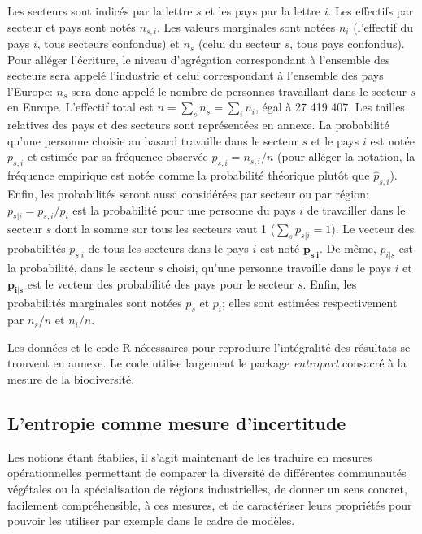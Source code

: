 \documentclass[fleqn,10pt]{ArtEcoFoG} %
\begin{document}
Les secteurs sont indicés par la lettre \(s\) et les pays par la lettre
\(i\). Les effectifs par secteur et pays sont notés \(n_{s,i}\). Les
valeurs marginales sont notées \(n_i\) (l'effectif du pays \(i\), tous
secteurs confondus) et \(n_s\) (celui du secteur \(s\), tous pays
confondus). Pour alléger l'écriture, le niveau d'agrégation
correspondant à l'ensemble des secteurs sera appelé \og l'industrie\fg{}
et celui correspondant à l'ensemble des pays \og l'Europe\fg{}: \(n_s\)
sera donc appelé le nombre de personnes travaillant dans le secteur
\(s\) en Europe. L'effectif total est \(n=\sum_s{n_s}=\sum_i{n_i}\),
égal à 27 419 407. Les tailles relatives des pays et des secteurs sont
représentées en annexe. La probabilité qu'une personne choisie au hasard
travaille dans le secteur \(s\) et le pays \(i\) est notée \(p_{s,i}\)
et estimée par sa fréquence observée \(p_{s,i}=n_{s,i}/n\) (pour alléger
la notation, la fréquence empirique est notée comme la probabilité
théorique plutôt que \(\hat{p}_{s,i}\)). Enfin, les probabilités seront
aussi considérées par secteur ou par région: \(p_{s|i}= p_{s,i}/p_i\)
est la probabilité pour une personne du pays \(i\) de travailler dans le
secteur \(s\) dont la somme sur tous les secteurs vaut 1
(\(\sum_s{p_{s|i}}=1\)). Le vecteur des probabilités \(p_{s|i}\) de tous
les secteurs dans le pays \(i\) est noté \(\mathbf{p_{s|i}}\). De même,
\(p_{i|s}\) est la probabilité, dans le secteur \(s\) choisi, qu'une
personne travaille dans le pays \(i\) et \(\mathbf{p_{i|s}}\) est le
vecteur des probabilité des pays pour le secteur \(s\). Enfin, les
probabilités marginales sont notées \(p_s\) et \(p_i\); elles sont
estimées respectivement par \(n_{s}/n\) et \(n_{i}/n\).

Les données et le code R \citep{R} nécessaires pour reproduire
l'intégralité des résultats se trouvent en annexe. Le code utilise
largement le package \emph{entropart} \citep{Marcon2014c} consacré à la
mesure de la biodiversité.

\subsection{L'entropie comme mesure
d'incertitude}\label{lentropie-comme-mesure-dincertitude}

Les notions étant établies, il s'agit maintenant de les traduire en
mesures opérationnelles permettant de comparer la diversité de
différentes communautés végétales ou la spécialisation de régions
industrielles, de donner un sens concret, facilement compréhensible, à
ces mesures, et de caractériser leurs propriétés pour pouvoir les
utiliser par exemple dans le cadre de modèles.
\end{document}
